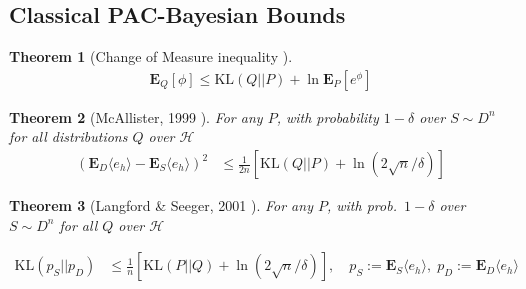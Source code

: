 \documentclass[10pt,a4paper]{article}
\newtheorem{theorem}{Theorem}
\newcommand{\E}{{\mathbf{E}}}
\begin{document}
\subsection{Classical PAC-Bayesian Bounds}

\begin{theorem}[Change of Measure inequality \cite{donsker1975asymptotic}]
\begin{align*}
\E_Q [\phi]  \le \text{KL}(Q||P) + \ln \E_P\left[ e^\phi \right]
\end{align*}
\end{theorem}

\begin{theorem}[McAllister, 1999 \cite{mcallester1999pac}]
For any $P$, with probability $1-\delta$ over $S \sim D^n$ for all distributions $Q$ over $\mathcal H$
\begin{align*}
( \E_D \langle e_h \rangle  - \E_S \langle e_h \rangle)^2 &
	 \le \frac 1{2n} \left[  \text{KL}(Q||P)  + \ln (2 \sqrt n/\delta) \right]
\end{align*}
\end{theorem}

\begin{theorem}[Langford \& Seeger, 2001 \cite{langford2001bounds}]  For any $P$, with prob.~$1-\delta$ over $S \sim D^n$ for all $Q$ over $\mathcal H$

\label{theorem:cross}
\begin{align*}
\text{KL}\left( p_S || p_D \right) 
	& \le \frac 1n \left[ \text{KL}(P||Q) + \ln (2\sqrt n/\delta) \right], \quad 
	p_S := \E_S \langle e_h \rangle, \; p_D := \E_D \langle e_h \rangle\
\end{align*}
\end{theorem}
\end{document}
